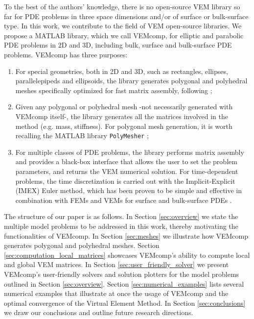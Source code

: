 \documentclass[a4paper]{article}
\begin{document}
To the best of the authors' knowledge, there is no open-source VEM library so far for PDE problems in three space dimensions and/or of surface or bulk-surface type. In this work,  we contribute to the field of VEM open-source libraries. We propose a MATLAB library,  which we call VEMcomp, for elliptic and parabolic PDE problems in 2D and 3D, including bulk, surface and bulk-surface PDE problems.  VEMcomp has three purposes:
\begin{enumerate}
\item For special geometries, both in 2D and 3D, such as rectangles, ellipses, parallelepipeds and ellipsoids, the library generates polygonal and polyhedral meshes specifically optimized for fast matrix assembly, following \cite{frittelli2021bulk, frittelli2023bsrds};
\item Given any polygonal or polyhedral mesh -not necessarily generated with VEMcomp itself-, the library generates all the matrices involved in the method (e.g. mass, stiffness).  For polygonal mesh generation, it is worth recalling the MATLAB library \texttt{PolyMesher} \cite{Talischi_2012};
\item For multiple classes of PDE problems,  the library performs matrix assembly and provides a black-box interface that allows the user to set the problem parameters, and returns the VEM numerical solution. For time-dependent problems, the time discretization is carried out with the Implicit-Explicit (IMEX) Euler method,  which has been proven to be simple and effective in combination with FEMs and VEMs for surface \cite{Frittelli2017preserving, Frittelli2017cross} and bulk-surface PDEs \cite{frittelli2021bulk, frittelli2023bsrds}.
\end{enumerate}
%
The structure of our paper is as follows. In Section \ref{sec:overview} we state the multiple model problems to be addressed in this work, thereby motivating the functionalities of VEMcomp.  In Section \ref{sec:meshes} we illustrate how VEMcomp generates polygonal and polyhedral meshes. Section \ref{sec:computation_local_matrices} showcases VEMcomp's ability to compute local and global VEM matrices. In Section \ref{sec:user_friendly_solver} we present VEMcomp's user-friendly solvers and solution plotters for the model problems outlined in Section \ref{sec:overview}.  Section \ref{sec:numerical_examples} lists several numerical examples that illustrate at once the usage of VEMcomp and the optimal convergence of the Virtual Element Method. In Section \ref{sec:conclusions} we draw our conclusions and outline future research directions.
\end{document}
